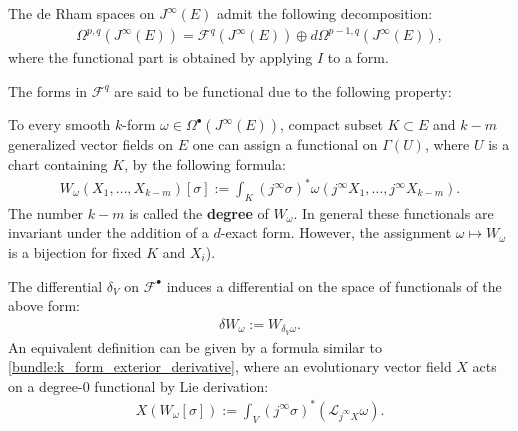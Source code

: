     \begin{property}\label{var:functional_decomposition}
        The de Rham spaces on $J^\infty(E)$ admit the following decomposition:
        \begin{gather}
            \Omega^{p,q}(J^\infty(E)) = \mathcal{F}^q(J^\infty(E))\oplus d\Omega^{p-1,q}(J^\infty(E)),
        \end{gather}
        where the functional part is obtained by applying $I$ to a form.
    \end{property}

    The forms in $\mathcal{F}^q$ are said to be functional due to the following property:
    \begin{property}[Functionals]
        To every smooth $k$-form $\omega\in\Omega^\bullet(J^\infty(E))$, compact subset $K\subset E$ and $k-m$ generalized vector fields on $E$ one can assign a functional on $\Gamma(U)$, where $U$ is a chart containing $K$, by the following formula:
        \begin{gather}
            \label{var:functionals}
            W_\omega(X_1,\ldots,X_{k-m})[\sigma] := \int_K(j^\infty\sigma)^*\omega(j^\infty X_1,\ldots,j^\infty X_{k-m}).
        \end{gather}
        The number $k-m$ is called the \textbf{degree} of $W_\omega$. In general these functionals are invariant under the addition of a $d$-exact form. However, the assignment $\omega\mapsto W_\omega$ is a bijection for fixed $K$ and $X_i$).
    \end{property}
    \begin{construct}
        The differential $\delta_V$ on $\mathcal{F}^\bullet$ induces a differential on the space of functionals of the above form:
        \begin{gather}
            \delta W_\omega := W_{\delta_V\omega}.
        \end{gather}
        An equivalent definition can be given by a formula similar to \eqref{bundle:k_form_exterior_derivative}, where an evolutionary vector field $X$ acts on a degree-$0$ functional by Lie derivation:
        \begin{gather}
            X(W_\omega[\sigma]) := \int_V(j^\infty\sigma)^*(\mathcal{L}_{j^\infty X}\omega).
        \end{gather}
    \end{construct}


